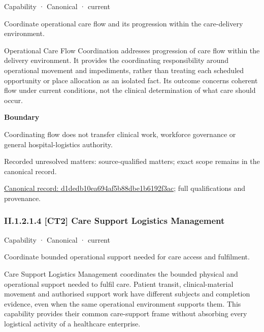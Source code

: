 \label{element:d1dedb10ea694af5b88dbe1b6192f3ac}
{\small Capability · Canonical · current}\par

Coordinate operational care flow and its progression within the care-delivery environment.



Operational Care Flow Coordination addresses progression of care flow within the delivery environment. It provides the coordinating responsibility around operational movement and impediments, rather than treating each scheduled opportunity or place allocation as an isolated fact. Its outcome concerns coherent flow under current conditions, not the clinical determination of what care should occur.



\textbf{Boundary}



Coordinating flow does not transfer clinical work, workforce governance or general hospital-logistics authority.


{\small Recorded unresolved matters: source-qualified matters; exact scope remains in the canonical record.}\par
{\footnotesize \href{../../../../continuum/strategy/capability/d1dedb10ea694af5b88dbe1b6192f3ac.md}{Canonical record: d1dedb10ea694af5b88dbe1b6192f3ac}; full qualifications and provenance.}\par
\subsubsection*{II.1.2.1.4 [CT2] Care Support Logistics Management}
\label{navigation:II.1.2.1.4}

\label{element:92be036674254f719cf4bb613120128a}
{\small Capability · Canonical · current}\par

Coordinate bounded operational support needed for care access and fulfilment.



Care Support Logistics Management coordinates the bounded physical and operational support needed to fulfil care. Patient transit, clinical-material movement and authorised support work have different subjects and completion evidence, even when the same operational environment supports them. This capability provides their common care-support frame without absorbing every logistical activity of a healthcare enterprise.



